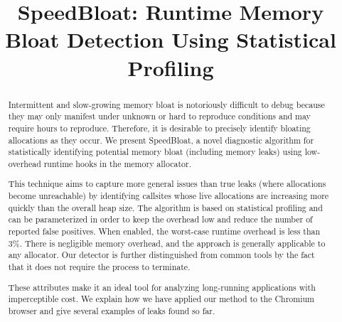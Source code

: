 \documentclass[preprint, numbers]{sigplanconf}
\begin{document}
\setlength{\pdfpageheight}{\paperheight}
\setlength{\pdfpagewidth}{\paperwidth}




\title{SpeedBloat: Runtime Memory Bloat Detection Using Statistical Profiling}
\subtitle{}

\iffalse
\authorinfo{Micha{\l} W{\l}odarczyk}%
           {University of Warsaw}
           {m.wlodarczyk@mimuw.edu.pl}
\authorinfo{Ben Cheng}
           {Google Inc.}
           {bccheng@google.com}
\authorinfo{Simon Que}
           {Google Inc.}
           {sque@google.com}
\fi
{}

\maketitle

\begin{abstract}
Intermittent and slow-growing memory bloat is notoriously difficult to
debug because they may only manifest under unknown or hard to
reproduce conditions and may require hours to reproduce.  Therefore,
it is desirable to precisely identify bloating allocations as they
occur.  We present SpeedBloat, a novel diagnostic algorithm for statistically
identifying potential memory bloat (including memory leaks) using
low-overhead runtime hooks in the memory allocator.

This technique aims to capture more general issues than true leaks
(where allocations become unreachable) by identifying callsites whose
live allocations are increasing more quickly than the overall heap size.
The algorithm is based on statistical profiling and can be parameterized in order to
keep the overhead low and reduce the number of reported false positives.
When enabled, the worst-case runtime overhead is less than 3\%.
There is negligible memory overhead, and the approach is generally applicable to any allocator.
Our detector is further distinguished from common tools by the fact that
it does not require the process to terminate.

These attributes make it an ideal tool for analyzing long-running applications with imperceptible cost.
We explain how we have applied our method to the Chromium browser and give
several examples of leaks found so far.
\end{abstract}
\end{document}

